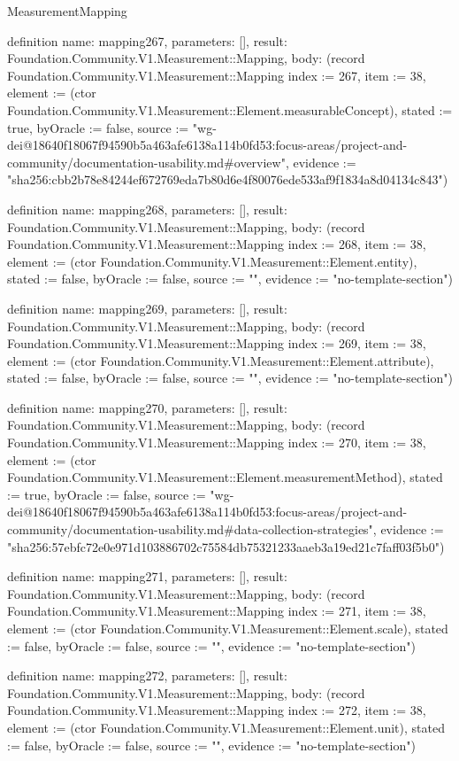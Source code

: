 \begin{lexlean}{MeasurementMapping}
\begin{semanticmodule}
definition{
  name: mapping267,
  parameters: [],
  result: Foundation.Community.V1.Measurement::Mapping,
  body: (record Foundation.Community.V1.Measurement::Mapping {index := 267, item := 38, element := (ctor Foundation.Community.V1.Measurement::Element.measurableConcept), stated := true, byOracle := false, source := "wg-dei@18640f18067f94590b5a463afe6138a114b0fd53:focus-areas/project-and-community/documentation-usability.md#overview", evidence := "sha256:cbb2b78e84244ef672769eda7b80d6e4f80076ede533af9f1834a8d04134c843"})
}

definition{
  name: mapping268,
  parameters: [],
  result: Foundation.Community.V1.Measurement::Mapping,
  body: (record Foundation.Community.V1.Measurement::Mapping {index := 268, item := 38, element := (ctor Foundation.Community.V1.Measurement::Element.entity), stated := false, byOracle := false, source := "", evidence := "no-template-section"})
}

definition{
  name: mapping269,
  parameters: [],
  result: Foundation.Community.V1.Measurement::Mapping,
  body: (record Foundation.Community.V1.Measurement::Mapping {index := 269, item := 38, element := (ctor Foundation.Community.V1.Measurement::Element.attribute), stated := false, byOracle := false, source := "", evidence := "no-template-section"})
}

definition{
  name: mapping270,
  parameters: [],
  result: Foundation.Community.V1.Measurement::Mapping,
  body: (record Foundation.Community.V1.Measurement::Mapping {index := 270, item := 38, element := (ctor Foundation.Community.V1.Measurement::Element.measurementMethod), stated := true, byOracle := false, source := "wg-dei@18640f18067f94590b5a463afe6138a114b0fd53:focus-areas/project-and-community/documentation-usability.md#data-collection-strategies", evidence := "sha256:57ebfc72e0e971d103886702c75584db75321233aaeb3a19ed21c7faff03f5b0"})
}

definition{
  name: mapping271,
  parameters: [],
  result: Foundation.Community.V1.Measurement::Mapping,
  body: (record Foundation.Community.V1.Measurement::Mapping {index := 271, item := 38, element := (ctor Foundation.Community.V1.Measurement::Element.scale), stated := false, byOracle := false, source := "", evidence := "no-template-section"})
}

definition{
  name: mapping272,
  parameters: [],
  result: Foundation.Community.V1.Measurement::Mapping,
  body: (record Foundation.Community.V1.Measurement::Mapping {index := 272, item := 38, element := (ctor Foundation.Community.V1.Measurement::Element.unit), stated := false, byOracle := false, source := "", evidence := "no-template-section"})
}


\end{semanticmodule}
\end{lexlean}
